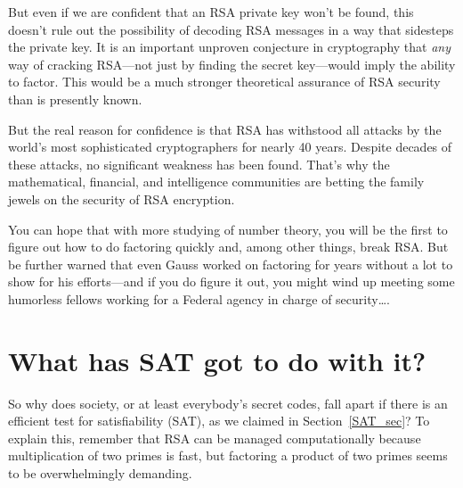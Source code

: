But even if we are confident that an RSA private key won't be found,
this doesn't rule out the possibility of decoding RSA messages in a
way that sidesteps the private key.  It is an important unproven
conjecture in cryptography that \emph{any} way of cracking RSA---not
just by finding the secret key---would imply the ability to factor.
This would be a much stronger theoretical assurance of RSA security
than is presently known.

But the real reason for confidence is that RSA has withstood all
attacks by the world's most sophisticated cryptographers for nearly 40
years.  Despite decades of these attacks, no significant weakness has
been found.  That's why the mathematical, financial, and intelligence
communities are betting the family jewels on the security of RSA
encryption.

You can hope that with more studying of number theory, you will be the
first to figure out how to do factoring quickly and, among other
things, break RSA.  But be further warned that even Gauss worked on
factoring for years without a lot to show for his efforts---and if you
do figure it out, you might wind up meeting some humorless fellows
working for a Federal agency in charge of security\dots.

\begin{problems}
\practiceproblems
{}

\classproblems
{}

\homeworkproblems
{}

\examproblems
{}

\end{problems}

\section{What has SAT got to do with it?}\label{SAT_RSA_sec}
So why does society, or at least everybody's secret codes, fall apart
if there is an efficient test for satisfiability%
(SAT), as we claimed
in Section~\ref{SAT_sec}?  To explain this, remember that RSA can be
managed computationally because multiplication of two primes is fast,
but factoring a product of two primes seems to be overwhelmingly
demanding.


